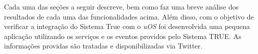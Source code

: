 	Cada uma das seções a seguir descreve, bem como faz uma breve análise dos
	resultados de cada uma das funcionalidades acima. Além disso, com o objetivo de
	verificar a integração do Sistema True com o \textit{uOS} foi desenvolvida uma pequena
	aplicação utilizando os serviços e os eventos providos pelo Sistema TRUE. As
	informações providas são tratadas e disponibilizadas via Twitter\cite{twitter,
	twitterUnb}.

	

	

	

	